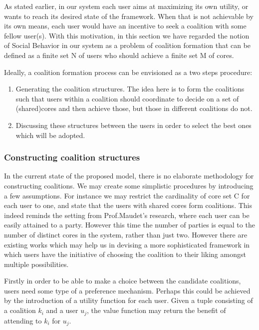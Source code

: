 \documentclass{article}
\begin{document}
As stated earlier, in our system each user aims at maximizing its own utility, or wants to reach its desired state of the framework. When that is not achievable by its own means, each user would have an incentive to seek a coalition with some fellow user(s). 
With this motivation, in this section we have regarded the notion of Social Behavior in our system as a problem of coalition formation that can be defined as a finite set N of users who should achieve a finite set M of cores. 

Ideally, a coalition formation process can be envisioned as a two steps procedure:
\begin{enumerate}
\item Generating the coalition structures. The idea here is to form the coalitions such that
users within a coalition should coordinate to decide on a set of (shared)cores and then achieve those, but
those in different coalitions do not.
\item Discussing these structures between the users in order to select the best ones which
will be adopted.
\end{enumerate}

\subsubsection{Constructing coalition structures}

In the current state of the proposed model, there is no elaborate methodology for constructing coalitions. We may create some simplistic procedures by introducing a few assumptions. For instance we may restrict the cardinality of core set C for each user to one, and state that the users with shared cores form coalitions. This indeed reminds the setting from Prof.Maudet's research, where each user can be easily attained to a party. However this time the number of parties is equal to the number of distinct cores in the system, rather than just two. However there are existing works which may help us in devising a more sophisticated framework in which users have the initiative of choosing the coalition to their liking amongst multiple possibilities. 

Firstly in order to be able to make a choice between the candidate coalitions, users need some type of a preference mechanism. Perhaps this could be achieved by the introduction of a utility function for each user. Given a tuple consisting of a coalition $k_i$ and a user $u_j$,  the value function may return the benefit of attending to $k_i$ for $u_j$.
\end{document}
